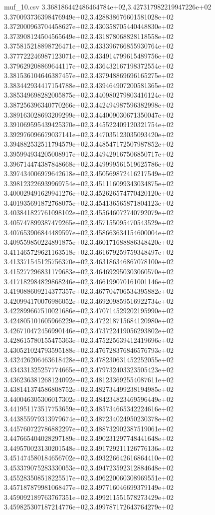 \begin{filecontents*}{muf_10.csv}
3.368186442486464784e+02,3.427317982219947226e+02
3.370093736398476949e+02,3.428838676601581028e+02
3.372000963704458627e+02,3.430358705440448830e+02
3.373908124504565649e+02,3.431878068828118558e+02
3.375815218898726471e+02,3.433396766855930764e+02
3.377722246987123071e+02,3.434914799615489756e+02
3.379629208869644117e+02,3.436432167198372554e+02
3.381536104646387457e+02,3.437948869696165275e+02
3.383442934417154788e+02,3.439464907200581365e+02
3.385349698282005875e+02,3.440980279803416124e+02
3.387256396340770266e+02,3.442494987596382998e+02
3.389163028693209299e+02,3.444009030671350047e+02
3.391069595439425370e+02,3.445522409120321754e+02
3.392976096679037141e+02,3.447035123035093420e+02
3.394882532511794579e+02,3.448547172507987852e+02
3.395994934205008917e+02,3.449429167506850717e+02
3.396714474387848668e+02,3.449999561519625786e+02
3.397434006979642618e+02,3.450569872416217549e+02
3.398123226939969754e+02,3.451116099343034875e+02
3.400029491629941276e+02,3.452626574770420120e+02
3.401935691872768075e+02,3.454136565871804123e+02
3.403841827761098102e+02,3.455646072740792079e+02
3.405747899387479265e+02,3.457155095470543529e+02
3.407653906844489597e+02,3.458663634154600004e+02
3.409559850224891875e+02,3.460171688886348420e+02
3.411465729621163518e+02,3.461679259759348497e+02
3.413371545125756370e+02,3.463186346867078100e+02
3.415277296831179683e+02,3.464692950303060570e+02
3.417182984829868246e+02,3.466199070161001146e+02
3.419088609214377357e+02,3.467704706534395882e+02
3.420994170076986052e+02,3.469209859516922734e+02
3.422899667510021686e+02,3.470714529202195990e+02
3.424805101605966229e+02,3.472218715684120980e+02
3.426710472456990146e+02,3.473722419056293802e+02
3.428615780155475363e+02,3.475225639412419696e+02
3.430521024793595188e+02,3.476728376846576793e+02
3.432426206463618428e+02,3.478230631452252055e+02
3.434331325257774665e+02,3.479732403323505423e+02
3.436236381268124092e+02,3.481233692554087611e+02
3.438141374586808752e+02,3.482734499238194985e+02
3.440046305306017302e+02,3.484234823469596449e+02
3.441951173517753659e+02,3.485734665342224616e+02
3.443855979313979674e+02,3.487234024950230378e+02
3.445760722786882297e+02,3.488732902387519061e+02
3.447665404028297189e+02,3.490231297748441648e+02
3.449570023130201548e+02,3.491729211126776136e+02
3.451474580184656702e+02,3.493226642616864410e+02
3.453379075283330053e+02,3.494723592312884648e+02
3.455283508518225517e+02,3.496220060308969551e+02
3.457187879981068477e+02,3.497716046699379149e+02
3.459092189763767351e+02,3.499211551578273429e+02
3.459825307187214776e+02,3.499787172643764279e+02

\end{filecontents*}
